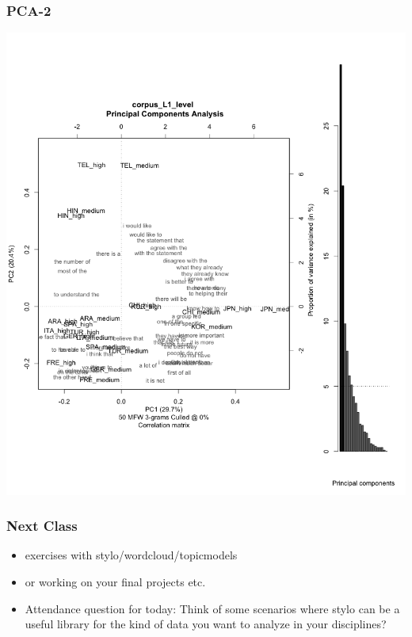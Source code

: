 \documentclass{beamer}
\begin{document}
\begin{frame}
\frametitle{PCA-2}
  \includegraphics[width=.7\textwidth]{alt3.png}
\end{frame}

\begin{frame}
\frametitle{Next Class}
\begin{itemize}
\item exercises with stylo/wordcloud/topicmodels
\item or working on your final projects etc.
\item Attendance question for today: Think of some scenarios where stylo can be a useful library for the kind of data you want to analyze in your disciplines?
\end{itemize}
\end{frame}
\end{document}
